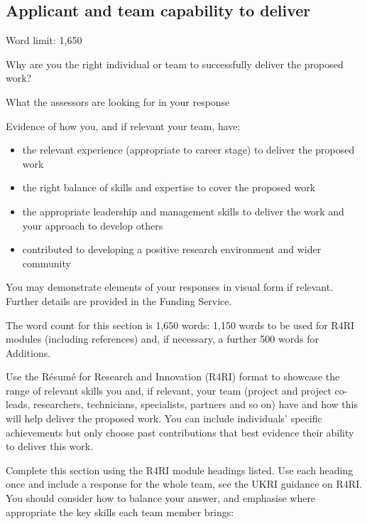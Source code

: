 \documentclass[12in]{article}
\begin{document}
\pagebreak

\subsection{Applicant and team capability to deliver}

{\color{red}

Word limit: 1,650

Why are you the right individual or team to successfully deliver the proposed
work?

What the assessors are looking for in your response

Evidence of how you, and if relevant your team, have:

\begin{itemize}

	\item the relevant experience (appropriate to career stage) to deliver the proposed
work

	\item the right balance of skills and expertise to cover the proposed work

	\item the appropriate leadership and management skills to deliver the work and
your approach to develop others

	\item contributed to developing a positive research environment and wider
community

\end{itemize}

You may demonstrate elements of your responses in visual form if relevant.
Further details are provided in the Funding Service.

The word count for this section is 1,650 words: 1,150 words to be used for R4RI
modules (including references) and, if necessary, a further 500 words for
Additions.

Use the Résumé for Research and Innovation (R4RI) format to showcase the
range of relevant skills you and, if relevant, your team (project and project co-
leads, researchers, technicians, specialists, partners and so on) have and how
this will help deliver the proposed work. You can include individuals’ specific
achievements but only choose past contributions that best evidence their ability
to deliver this work.

Complete this section using the R4RI module headings listed. Use each
heading once and include a response for the whole team, see the UKRI
guidance on R4RI. You should consider how to balance your answer, and
emphasise where appropriate the key skills each team member brings:

}
\end{document}
